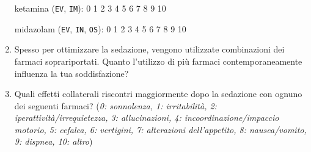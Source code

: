 \begin{tcolorbox}
\begin{enumerate}
            ketamina (\texttt{EV}, \texttt{IM}):
            \hfill
            \colorbox{xkcdCloudyBlue!10}{0} \colorbox{xkcdCloudyBlue!10}{1} \colorbox{xkcdCloudyBlue!10}{2} \colorbox{xkcdCloudyBlue!10}{3} \colorbox{xkcdCloudyBlue!10}{4} \colorbox{xkcdCloudyBlue!10}{5} \colorbox{xkcdCloudyBlue!10}{6} \colorbox{xkcdCloudyBlue!10}{7} \colorbox{xkcdCloudyBlue!10}{8} \colorbox{xkcdCloudyBlue!10}{9} \colorbox{xkcdCloudyBlue!10}{10}
            
            midazolam (\texttt{EV}, \texttt{IN}, \texttt{OS}):
            \hfill
            \colorbox{xkcdCloudyBlue!10}{0} \colorbox{xkcdCloudyBlue!10}{1} \colorbox{xkcdCloudyBlue!10}{2} \colorbox{xkcdCloudyBlue!10}{3} \colorbox{xkcdCloudyBlue!10}{4} \colorbox{xkcdCloudyBlue!10}{5} \colorbox{xkcdCloudyBlue!10}{6} \colorbox{xkcdCloudyBlue!10}{7} \colorbox{xkcdCloudyBlue!10}{8} \colorbox{xkcdCloudyBlue!10}{9} \colorbox{xkcdCloudyBlue!10}{10}

           \item Spesso per ottimizzare la sedazione, vengono utilizzate combinazioni dei farmaci soprariportati. Quanto l'utilizzo di più farmaci contemporaneamente influenza la tua soddisfazione?
           
           \item Quali effetti collaterali riscontri maggiormente dopo la sedazione con ognuno dei seguenti farmaci? (\emph{0: sonnolenza, 1: irritabilità, 2: iperattività/irrequietezza, 3: allucinazioni, 4: incoordinazione/impaccio motorio, 5: cefalea, 6: vertigini, 7: alterazioni dell’appetito, 8: nausea/vomito, 9: dispnea, 10: altro})
           
\begin{comment} %
    \bgroup
        \def\arraystretch{1.5} 
            \begin{tabular}{ll}
                propofol (\texttt{EV}): & 0 1 2 3 4 5 6 7 8 9 10\\
                ketamina (\texttt{EV}, \texttt{IM}): & 0 1 2 3 4 5 6 7 8 9 10\\
                dexmedetomidina (\texttt{EV}, \texttt{IM}): & 0 1 2 3 4 5 6 7 8 9 10\\
                midazolam (\texttt{EV}, \texttt{IN}, \texttt{OS}): & 0 1 2 3 4 5 6 7 8 9 10
            \end{tabular}
    \egroup   
\end{comment}


\end{enumerate}
\end{tcolorbox}
